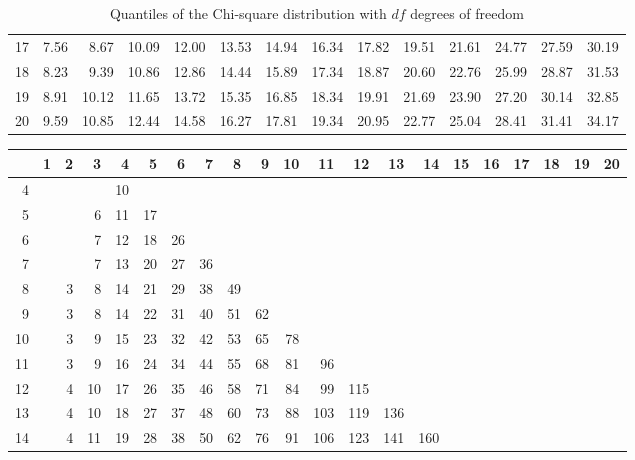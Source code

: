 \begin{table}[!ht]
\begin{tabular}{@{}r@{~~}r@{~~}r@{~~}r@{~~}r@{~~}r@{~~}r@{~~}r@{~~}r@{~~}r@{~~}r@{~~}r@{~~}r@{~~}r@{}}
  17 & 7.56 & 8.67 & 10.09 & 12.00 & 13.53 & 14.94 & 16.34 & 17.82 & 19.51 & 21.61 & 24.77 & 27.59 & 30.19 \\ 
  18 & 8.23 & 9.39 & 10.86 & 12.86 & 14.44 & 15.89 & 17.34 & 18.87 & 20.60 & 22.76 & 25.99 & 28.87 & 31.53 \\ 
  19 & 8.91 & 10.12 & 11.65 & 13.72 & 15.35 & 16.85 & 18.34 & 19.91 & 21.69 & 23.90 & 27.20 & 30.14 & 32.85 \\ 
  20 & 9.59 & 10.85 & 12.44 & 14.58 & 16.27 & 17.81 & 19.34 & 20.95 & 22.77 & 25.04 & 28.41 & 31.41 & 34.17 \\ 
   \hline
\end{tabular}
\caption{Quantiles of the Chi-square distribution with $df$ degrees of freedom}
\label{tab:chi2}
\end{table}

\begin{table}[ht]
\centering
\begin{tabular}{@{}r@{~~}r@{~~}r@{~~}r@{~~}r@{~~}r@{~~}r@{~~}r@{~~}r@{~~}r@{~~}r@{~~}r@{~~}r@{~~}r@{~~}r@{~~}r@{~~}r@{~~}r@{~~}r@{~~}r@{~~}r@{}}
  \hline
 & 1 & 2 & 3 & 4 & 5 & 6 & 7 & 8 & 9 & 10 & 11 & 12 & 13 & 14 & 15 & 16 & 17 & 18 & 19 & 20 \\ 
  \hline
  4 &  &  &  & 10 &  &  &  &  &  &  &  &  &  &  &  &  &  &  &  &  \\ 
  5 &  &  & 6 & 11 & 17 &  &  &  &  &  &  &  &  &  &  &  &  &  &  &  \\ 
  6 &  &  & 7 & 12 & 18 & 26 &  &  &  &  &  &  &  &  &  &  &  &  &  &  \\ 
  7 &  &  & 7 & 13 & 20 & 27 & 36 &  &  &  &  &  &  &  &  &  &  &  &  &  \\ 
  8 &  & 3 & 8 & 14 & 21 & 29 & 38 & 49 &  &  &  &  &  &  &  &  &  &  &  &  \\ 
  9 &  & 3 & 8 & 14 & 22 & 31 & 40 & 51 & 62 &  &  &  &  &  &  &  &  &  &  &  \\ 
  10 &  & 3 & 9 & 15 & 23 & 32 & 42 & 53 & 65 & 78 &  &  &  &  &  &  &  &  &  &  \\ 
  11 &  & 3 & 9 & 16 & 24 & 34 & 44 & 55 & 68 & 81 & 96 &  &  &  &  &  &  &  &  &  \\ 
  12 &  & 4 & 10 & 17 & 26 & 35 & 46 & 58 & 71 & 84 & 99 & 115 &  &  &  &  &  &  &  &  \\ 
  13 &  & 4 & 10 & 18 & 27 & 37 & 48 & 60 & 73 & 88 & 103 & 119 & 136 &  &  &  &  &  &  &  \\ 
  14 &  & 4 & 11 & 19 & 28 & 38 & 50 & 62 & 76 & 91 & 106 & 123 & 141 & 160 &  &  &  &  &  &  \\ 

\end{tabular}
\end{table}
